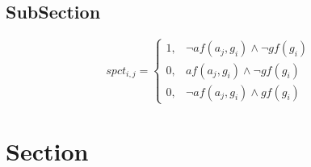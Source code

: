 \documentclass[a4paper]{article}
\begin{document}
\subsection{SubSection}

\begin{equation}
spct_{i,j} =
\begin{cases}
1, & \text{$\neg af(a_j,g_i) \wedge \neg gf(g_i)$}\\
0, & \text{$af(a_j,g_i) \wedge \neg gf(g_i)$}\\
0, & \text{$\neg af(a_j,g_i) \wedge gf(g_i)$}
\end{cases}
\end{equation}

\section{Section}
\end{document}

